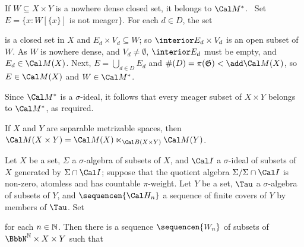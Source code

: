 {If $W\subseteq X\times Y$ is a nowhere dense closed set, it belongs to
$\Cal M^*$.   \Prf\   Set $E=\{x:W[\{x\}]$ is not meager$\}$.   For each
$d\in D$, the set


\noindent is a closed set in $X$ and $E_d\times V_d\subseteq W$;  so
$\interior E_d\times V_d$ is an open subset of $W$.   As $W$ is nowhere
dense, and $V_d\ne\emptyset$, $\interior E_d$ must be
empty, and $E_d\in\Cal M(X)$.   Next, $E=\bigcup_{d\in D}E_d$ and
$\#(D)=\pi(\frak G)<\add\Cal M(X)$, so $E\in\Cal M(X)$ and
$W\in\Cal M^*$.\ \Qed

Since $\Cal M^*$ is a $\sigma$-ideal, it follows that every meager
subset of $X\times Y$ belongs to $\Cal M^*$, as required.
}%

 If $X$ and $Y$ are separable metrizable spaces,
then $\Cal M(X\times Y)=\Cal M(X)\ltimes_{\Cal B(X\times Y)}\Cal M(Y)$.



Let $X$ be a set, $\Sigma$ a $\sigma$-algebra of subsets of $X$, and
$\Cal I$ a $\sigma$-ideal of subsets of $X$ generated by
$\Sigma\cap\Cal I$;  suppose that
the quotient algebra $\Sigma/\Sigma\cap\Cal I$ is non-zero, atomless and
has countable $\pi$-weight.
Let $Y$ be a set, $\Tau$ a $\sigma$-algebra of subsets of $Y$, and
$\sequencen{\Cal H_n}$ a sequence of finite covers of $Y$ by members of
$\Tau$.   Set


\noindent for each $n\in\Bbb N$.   Then there is a sequence
$\sequencen{W_n}$ of subsets of $\NN\times X\times Y$ such that

